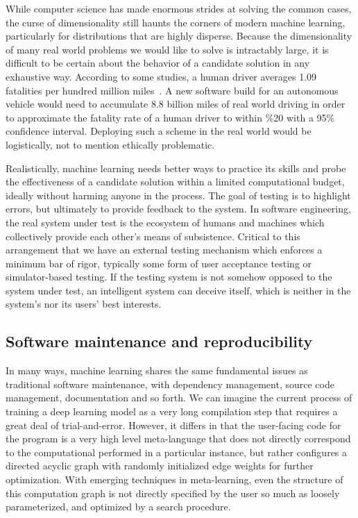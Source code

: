 \documentclass[12pt,initial,twoside,maitrise]{dms}
\numberwithin{equation}{section}
\numberwithin{table}{chapter}
\numberwithin{figure}{chapter}
\begin{document}
While computer science has made enormous strides at solving the common cases, the curse of dimensionality still haunts the corners of modern machine learning, particularly for distributions that are highly disperse. Because the dimensionality of many real world problems we would like to solve is intractably large, it is difficult to be certain about the behavior of a candidate solution in any exhaustive way. According to some studies, a human driver averages 1.09 fatalities per hundred million miles~\cite{kalra2016driving}. A new software build for an autonomous vehicle would need to accumulate 8.8 billion miles of real world driving in order to approximate the fatality rate of a human driver to within \%20 with a 95\% confidence interval. Deploying such a scheme in the real world would be logistically, not to mention ethically problematic.

Realistically, machine learning needs better ways to practice its skills and probe the effectiveness of a candidate solution within a limited computational budget, ideally without harming anyone in the process. The goal of testing is to highlight errors, but ultimately to provide feedback to the system. In software engineering, the real system under test is the ecosystem of humans and machines which collectively provide each other's means of subsistence. Critical to this arrangement that we have an external testing mechanism which enforces a minimum bar of rigor, typically some form of user acceptance testing or simulator-based testing. If the testing system is not somehow opposed to the system under test, an intelligent system can deceive itself, which is neither in the system's nor its users' best interests.

\subsection{Software maintenance and reproducibility}

In many ways, machine learning shares the same fundamental issues as traditional software maintenance, with dependency management, source code management, documentation and so forth. We can imagine the current process of training a deep learning model as a very long compilation step that requires a great deal of trial-and-error. However, it differs in that the user-facing code for the program is a very high level meta-language that does not directly correspond to the computational performed in a particular instance, but rather configures a directed acyclic graph with randomly initialized edge weights for further optimization. With emerging techniques in meta-learning, even the structure of this computation graph is not directly specified by the user so much as loosely parameterized, and optimized by a search procedure.
\end{document}

